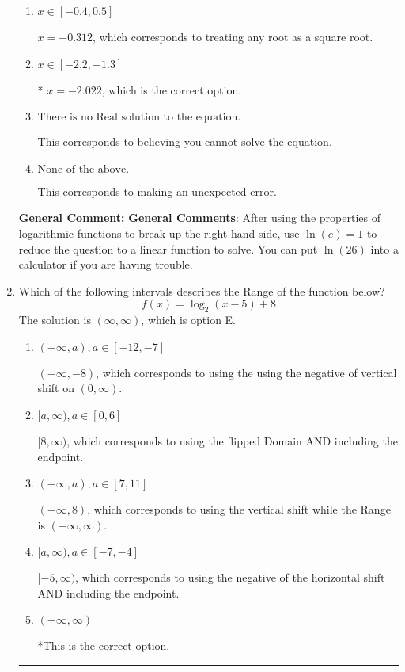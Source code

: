 \documentclass{extbook}[14pt]
\newcommand{\litem}[1]{\item #1

\rule{\textwidth}{0.4pt}}
\begin{document}
\begin{enumerate}
{\begin{enumerate}[label=\Alph*.]
$x = -13.543$, which corresponds to thinking you don't need to take the natural log of both sides before reducing, as if the equation already had a natural log on the right side.
\item \( x \in [-0.4, 0.5] \)

$x = -0.312$, which corresponds to treating any root as a square root.
\item \( x \in [-2.2, -1.3] \)

* $x = -2.022$, which is the correct option.
\item \( \text{There is no Real solution to the equation.} \)

This corresponds to believing you cannot solve the equation.
\item \( \text{None of the above.} \)

This corresponds to making an unexpected error.
\end{enumerate}

\textbf{General Comment:} \textbf{General Comments}: After using the properties of logarithmic functions to break up the right-hand side, use $\ln(e) = 1$ to reduce the question to a linear function to solve. You can put $\ln(26)$ into a calculator if you are having trouble.
}
\litem{
Which of the following intervals describes the Range of the function below?
\[ f(x) = \log_2{(x-5)}+8 \]The solution is \( (\infty, \infty) \), which is option E.\begin{enumerate}[label=\Alph*.]
\item \( (-\infty, a), a \in [-12, -7] \)

$(-\infty, -8)$, which corresponds to using the using the negative of vertical shift on $(0, \infty)$.
\item \( [a, \infty), a \in [0, 6] \)

$[8, \infty)$, which corresponds to using the flipped Domain AND including the endpoint.
\item \( (-\infty, a), a \in [7, 11] \)

$(-\infty, 8)$, which corresponds to using the vertical shift while the Range is $(-\infty, \infty)$.
\item \( [a, \infty), a \in [-7, -4] \)

$[-5, \infty)$, which corresponds to using the negative of the horizontal shift AND including the endpoint.
\item \( (-\infty, \infty) \)

*This is the correct option.
\end{enumerate}

}
\end{enumerate}
\end{document}
